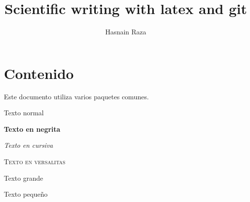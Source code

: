 \documentclass[12pt,a4paper]{article}
\title{Scientific writing with latex and git}
\author{Hasnain Raza}
\begin{document}
	
	\maketitle
	
	\section{Contenido}
	Este documento utiliza varios paquetes comunes.
	
	
	
	
	Texto normal
	
	\textbf{Texto en negrita}
	
	\textit{Texto en cursiva}
	
	\textsc{Texto en versalitas}
	
	{\Large Texto grande}
	
	{\footnotesize Texto pequeño}
	
	
\end{document}

